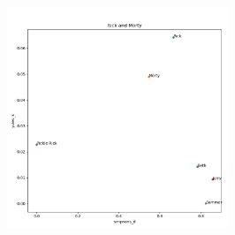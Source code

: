 \documentclass{article}
\newcommand{\mediumimagewidth}{250}
\begin{document}
\begin{titlepage}
\begin{figure}[H]
\centering
\includegraphics[width=\mediumimagewidth]{images/Rick and Morty_heuristics.png}
\end{figure}



\end{titlepage}
\end{document}
